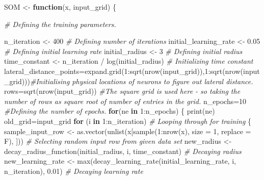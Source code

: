 \documentclass[
]{article}
\newenvironment{Shaded}{\begin{snugshade}}{\end{snugshade}}
\newcommand{\AttributeTok}[1]{\textcolor[rgb]{0.77,0.63,0.00}{#1}}
\newcommand{\CommentTok}[1]{\textcolor[rgb]{0.56,0.35,0.01}{\textit{#1}}}
\newcommand{\ControlFlowTok}[1]{\textcolor[rgb]{0.13,0.29,0.53}{\textbf{#1}}}
\newcommand{\DecValTok}[1]{\textcolor[rgb]{0.00,0.00,0.81}{#1}}
\newcommand{\FloatTok}[1]{\textcolor[rgb]{0.00,0.00,0.81}{#1}}
\newcommand{\FunctionTok}[1]{\textcolor[rgb]{0.00,0.00,0.00}{#1}}
\newcommand{\NormalTok}[1]{#1}
\newcommand{\OtherTok}[1]{\textcolor[rgb]{0.56,0.35,0.01}{#1}}
\newcommand{\SpecialCharTok}[1]{\textcolor[rgb]{0.00,0.00,0.00}{#1}}
\begin{document}
\begin{Shaded}
\begin{Highlighting}[]
\NormalTok{SOM }\OtherTok{\textless{}{-}} \ControlFlowTok{function}\NormalTok{(x, input\_grid) \{}
  
  
\CommentTok{\# Defining the training parameters.}
  
\NormalTok{   n\_iteration }\OtherTok{\textless{}{-}} \DecValTok{400} \CommentTok{\# Defining number of iterations}
\NormalTok{  initial\_learning\_rate }\OtherTok{\textless{}{-}} \FloatTok{0.05} \CommentTok{\# Defining initial learning rate}
\NormalTok{  initial\_radius }\OtherTok{\textless{}{-}} \DecValTok{3} \CommentTok{\# Defining initial radius}
\NormalTok{  time\_constant }\OtherTok{\textless{}{-}}\NormalTok{ n\_iteration }\SpecialCharTok{/} \FunctionTok{log}\NormalTok{(initial\_radius) }\CommentTok{\# Initializing time constant}
\NormalTok{  lateral\_distance\_points}\OtherTok{=}\FunctionTok{expand.grid}\NormalTok{(}\DecValTok{1}\SpecialCharTok{:}\FunctionTok{sqrt}\NormalTok{(}\FunctionTok{nrow}\NormalTok{(input\_grid)),}\DecValTok{1}\SpecialCharTok{:}\FunctionTok{sqrt}\NormalTok{(}\FunctionTok{nrow}\NormalTok{(input\_grid)))}\CommentTok{\#Initialising physical locations of neurons to figure out lateral distance.}
\NormalTok{  rows}\OtherTok{=}\FunctionTok{sqrt}\NormalTok{(}\FunctionTok{nrow}\NormalTok{(input\_grid)) }\CommentTok{\#The square grid is used here {-} so taking the number of rows as square root of number of entries in the grid.}
\NormalTok{  n\_epochs}\OtherTok{=}\DecValTok{10} \CommentTok{\#Defining the number of epochs.}
  \ControlFlowTok{for}\NormalTok{(ne }\ControlFlowTok{in} \DecValTok{1}\SpecialCharTok{:}\NormalTok{n\_epochs)}
\NormalTok{  \{}
    \FunctionTok{print}\NormalTok{(ne)}
\NormalTok{    old\_grid}\OtherTok{=}\NormalTok{input\_grid}
    \ControlFlowTok{for}\NormalTok{ (i }\ControlFlowTok{in} \DecValTok{1}\SpecialCharTok{:}\NormalTok{n\_iteration) }\CommentTok{\# Looping through for training}
\NormalTok{    \{}
\NormalTok{      sample\_input\_row }\OtherTok{\textless{}{-}} \FunctionTok{as.vector}\NormalTok{(}\FunctionTok{unlist}\NormalTok{(x[}\FunctionTok{sample}\NormalTok{(}\DecValTok{1}\SpecialCharTok{:}\FunctionTok{nrow}\NormalTok{(x), }\AttributeTok{size =} \DecValTok{1}\NormalTok{, }\AttributeTok{replace =}\NormalTok{ F), ])) }\CommentTok{\# Selecting random input row from given data set}
\NormalTok{      new\_radius }\OtherTok{\textless{}{-}} \FunctionTok{decay\_radius\_function}\NormalTok{(initial\_radius, i, time\_constant) }\CommentTok{\# Decaying radius}
\NormalTok{      new\_learning\_rate }\OtherTok{\textless{}{-}} \FunctionTok{max}\NormalTok{(}\FunctionTok{decay\_learning\_rate}\NormalTok{(initial\_learning\_rate, i, n\_iteration), }\FloatTok{0.01}\NormalTok{) }\CommentTok{\# Decaying learning rate}

\end{Highlighting}
\end{Shaded}
\end{document}
